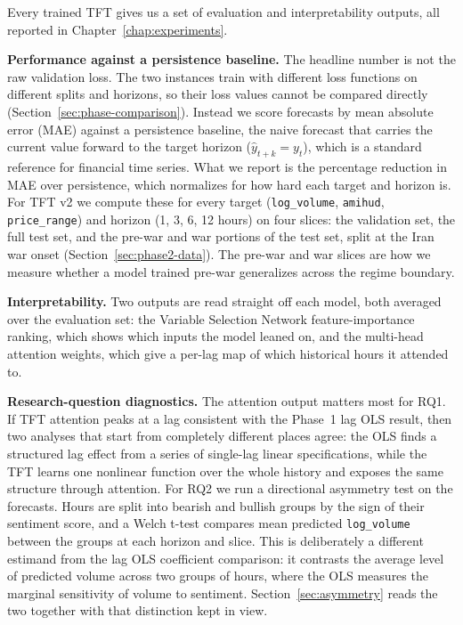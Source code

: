 Every trained TFT gives us a set of evaluation and interpretability outputs, all reported in Chapter~\ref{chap:experiments}.

\textbf{Performance against a persistence baseline.} The headline number is not the raw validation loss. The two instances train with different loss functions on different splits and horizons, so their loss values cannot be compared directly (Section~\ref{sec:phase-comparison}). Instead we score forecasts by mean absolute error (MAE) against a persistence baseline, the naive forecast that carries the current value forward to the target horizon ($\hat{y}_{t+k} = y_t$), which is a standard reference for financial time series. What we report is the percentage reduction in MAE over persistence, which normalizes for how hard each target and horizon is. For TFT v2 we compute these for every target (\texttt{log\_volume}, \texttt{amihud}, \texttt{price\_range}) and horizon (1, 3, 6, 12 hours) on four slices: the validation set, the full test set, and the pre-war and war portions of the test set, split at the Iran war onset (Section~\ref{sec:phase2-data}). The pre-war and war slices are how we measure whether a model trained pre-war generalizes across the regime boundary.

\textbf{Interpretability.} Two outputs are read straight off each model, both averaged over the evaluation set: the Variable Selection Network feature-importance ranking, which shows which inputs the model leaned on, and the multi-head attention weights, which give a per-lag map of which historical hours it attended to.

\textbf{Research-question diagnostics.} The attention output matters most for RQ1. If TFT attention peaks at a lag consistent with the Phase~1 lag OLS result, then two analyses that start from completely different places agree: the OLS finds a structured lag effect from a series of single-lag linear specifications, while the TFT learns one nonlinear function over the whole history and exposes the same structure through attention. For RQ2 we run a directional asymmetry test on the forecasts. Hours are split into bearish and bullish groups by the sign of their sentiment score, and a Welch t-test compares mean predicted \texttt{log\_volume} between the groups at each horizon and slice. This is deliberately a different estimand from the lag OLS coefficient comparison: it contrasts the average level of predicted volume across two groups of hours, where the OLS measures the marginal sensitivity of volume to sentiment. Section~\ref{sec:asymmetry} reads the two together with that distinction kept in view.

